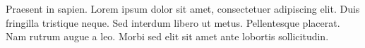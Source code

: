 

Praesent in sapien. Lorem ipsum dolor sit amet, consectetuer adipiscing elit.
Duis fringilla tristique neque. Sed interdum libero ut metus. Pellentesque placerat.
Nam rutrum augue a leo. Morbi sed elit sit amet ante lobortis sollicitudin.

\clearpage %

